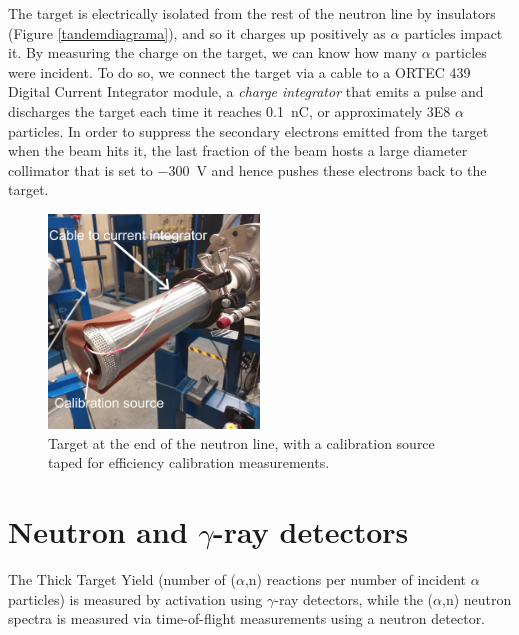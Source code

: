\documentclass[a4paper,12pt]{report}
\newcommand{\an}{($\alpha$,n) }
\begin{document}
The target is electrically isolated from the rest of the neutron line by insulators (Figure \ref{tandemdiagrama}), and so it charges up positively as $\alpha$ particles impact it.
By measuring the charge on the target, we can know how many $\alpha$ particles were incident.
To do so, we connect the target via a cable to a ORTEC 439 Digital Current Integrator module, a \textit{charge integrator} that emits a pulse and discharges the target each time it reaches \qty{0.1}{\nano\coulomb}, or approximately \num{3E8} $\alpha$ particles.
In order to suppress the secondary electrons emitted from the target when the beam hits it, the last fraction of the beam hosts a large diameter collimator that is set to \qty{-300}{\V} and hence pushes these electrons back to the target.

\begin{figure}[H]
	\centering
	\includegraphics[width=0.5\textwidth]{target_with_calibration.jpg}
	\caption{Target at the end of the neutron line, with a calibration source taped for efficiency calibration measurements.}
	\label{target_photo}
\end{figure}

\section{Neutron and $\gamma$-ray detectors}
The Thick Target Yield (number of \an reactions per number of incident $\alpha$ particles) is measured by activation using $\gamma$-ray detectors, while the \an neutron spectra is measured via time-of-flight measurements using a neutron detector.
\\
\end{document}
